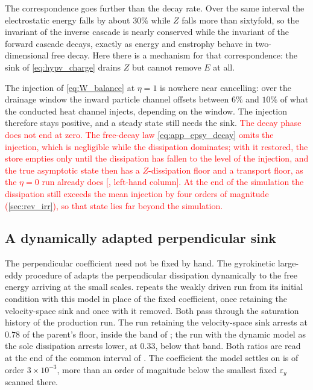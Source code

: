 \documentclass{jpp}
\begin{document}
The correspondence goes further than the decay rate. Over the same interval the electrostatic energy falls by about $30\%$ while $Z$ falls more than sixtyfold, so the invariant of the inverse cascade is nearly conserved while the invariant of the forward cascade decays, exactly as energy and enstrophy behave in two-dimensional free decay. Here there is a mechanism for that correspondence: the sink of \cref{eq:hypv_charge} drains $Z$ but cannot remove $E$ at all.

The injection of \cref{eq:W_balance} at $\eta = 1$ is nowhere near cancelling: over the drainage window the inward particle channel offsets between $6\%$ and $10\%$ of what the conducted heat channel injects, depending on the window. The injection therefore stays positive, and a steady state still needs the sink. \textcolor{red}{The decay phase does not end at zero. The free-decay law \cref{eq:app_epsy_decay} omits the injection, which is negligible while the dissipation dominates; with it restored, the store empties only until the dissipation has fallen to the level of the injection, and the true asymptotic state then has a $Z$-dissipation floor and a transport floor, as the $\eta = 0$ run already does [, left-hand column]. At the end of the simulation the dissipation still exceeds the mean injection by four orders of magnitude (\cref{sec:rev_irr}), so that state lies far beyond the simulation.}

\subsection{A dynamically adapted perpendicular sink}\label{app:epsy_gyroles}

The perpendicular coefficient need not be fixed by hand. The gyrokinetic large-eddy procedure of \citet{Morel2011} adapts the perpendicular dissipation dynamically to the free energy arriving at the small scales.  repeats the weakly driven run from its initial condition with this model in place of the fixed coefficient, once retaining the velocity-space sink and once with it removed. Both pass through the saturation history of the production run. The run retaining the velocity-space sink arrests at $0.78$ of the parent's floor, inside the band of ; the run with the dynamic model as the sole dissipation arrests lower, at $0.33$, below that band. Both ratios are read at the end of the common interval of . The coefficient the model settles on is of order $3\times10^{-3}$, more than an order of magnitude below the smallest fixed $\varepsilon_y$ scanned there.
\end{document}
